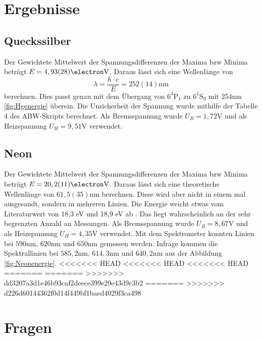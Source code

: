 \documentclass[11pt, a4paper]{article}
\begin{document}
    \section{Ergebnisse}

    \subsection{Queckssilber}

    Der Gewichtete Mittelwert der Spannungsdifferenzen der Maxima bzw Minima beträgt $E = 4,93(28) \si{\electron\volt}$. Daraus lässt sich eine Wellenlänge von 
    \begin{equation}
        \lambda = \frac{h \cdot c}{E} = 252(14) \si{\nano\meter}
    \end{equation}
    berechnen. Dies passt genau mit dem Übergang von $6^3\text{P}_1$ zu $6^1\text{S}_0$ mit $254 \si{\nano\meter}$ \ref{fig:Hgenergie} überein.
    Die Unsicherheit der Spannung wurde mithilfe der Tabelle 4 des ABW-Skripts \cite{ABW} berechnet. Als Bremsspannung wurde $U_B = 1,72 \si{\volt}$ und als Heizspannung $U_H = 9,51 \si{\volt}$ verwendet.

    \subsection{Neon}

    Der Gewichtete Mittelwert der Spannungsdifferenzen der Maxima bzw Minima beträgt $E = 20,2(11) \si{\electron\volt}$. Daraus lässt sich eine theoretische Wellenlänge von $61,5(35) \si{\nano\meter}$ berechnen. Diese wird aber nicht in einem mal ausgesandt, sondern in mehreren Linien. Die Energie weicht etwas vom Literaturwert von 18,3 eV und 18,9 eV ab \cite{FHV}. Das liegt wahrscheinlich an der sehr begrenzten Anzahl an Messungen.
    Als Bremsspannung wurde $U_B = 8,67 \si{\volt}$ und als Heizspannung $U_H = 4,35 \si{\volt}$ verwendet.
    Mit dem Spektrometer konnten Linien bei $590 \si{\nano\meter}$, $620 \si{\nano\meter}$ und $650 \si{\nano\meter}$ gemessen werden. Infrage kommen die Spektrallinien bei $585,2 \si{\nano\meter}$, $614,3 \si{\nano\meter}$ und $640,2 \si{\nano\meter}$ aus der Abbildung \ref{fig:Neonenergie}.
<<<<<<< HEAD
<<<<<<< HEAD
<<<<<<< HEAD
=======
=======
>>>>>>> dd3207a3d1e46b93caf2deece399e29e43d9c3b2
=======
>>>>>>> d226d60144362f0d14f449bf1baed4029f3ca498

    \section{Fragen}
\end{document}
